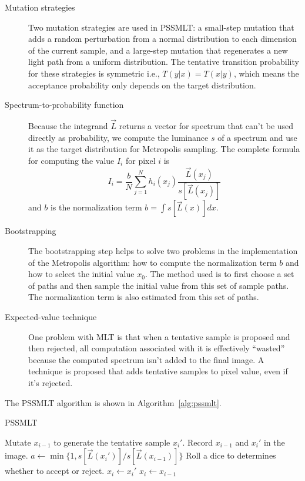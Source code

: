 \documentclass{article}
\begin{document}
\begin{description}
    \item[Mutation strategies] Two mutation strategies are used in PSSMLT: a small-step mutation that adds a random perturbation from a normal distribution to each dimension of the current sample, and a large-step mutation that regenerates a new light path from a uniform distribution. The tentative transition probability for these strategies is symmetric i.e., $T(y|x) = T(x|y)$, which means the acceptance probability only depends on the target distribution.
    \item[Spectrum-to-probability function] Because the integrand $\vec{L}$ returns a vector for spectrum that can't be used directly as probability, we compute the luminance $s$ of a spectrum and use it as the target distribution for Metropolis sampling. The complete formula for computing the value $I_i$ for pixel $i$ is
    \[
        I_i = \frac{b}{N}\sum_{j = 1}^N h_i(x_j) \frac{\vec{L}(x_j)}{s[\vec{L}(x_j)]}
    \]
    and $b$ is the normalization term $b = \int s[\vec{L}(x)]dx$.

    \item[Bootstrapping] The bootstrapping step helps to solve two problems in the implementation of the Metropolis algorithm: how to compute the normalization term $b$ and how to select the initial value $x_0$. The method used is to first choose a set of paths and then sample the initial value from this set of sample paths. The normalization term is also estimated from this set of paths.
    
    \item[Expected-value technique] One problem with MLT is that when a tentative sample is proposed and then rejected, all computation associated with it is effectively ``wasted'' because the computed spectrum isn't added to the final image. A technique \cite{mlt} is proposed that adds tentative samples to pixel value, even if it's rejected.
\end{description}

The PSSMLT algorithm is shown in Algorithm~\ref{alg:pssmlt}.

\begin{algorithm}
    \caption{PSSMLT}
    \label{alg:pssmlt}
    \begin{algorithmic}[1]
            \State Mutate $x_{i - 1}$ to generate the tentative sample $x_i'$.
            \State Record $x_{i - 1}$ and $x_i'$ in the image.
            \State $a \gets \min\{1, s[\vec{L}(x_i')] / s[\vec{L}(x_{i - 1})]\}$
            \State Roll a dice to determines whether to accept or reject.
                \State $x_i \gets x_i'$
            \Else
                \State $x_i \gets x_{i - 1}$
            \EndIf
        \EndFor
    \end{algorithmic}
\end{algorithm}
\end{document}
